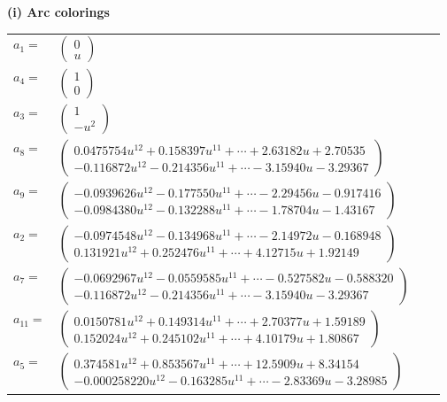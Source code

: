 \documentclass[1p]{elsarticle_modified}
\theoremstyle{definition}
\begin{document}
\flushleft \textbf{(i) Arc colorings}\\
\begin{tabular}{m{7pt} m{180pt} m{7pt} m{180pt} }
\flushright $a_{1}=$&$\begin{pmatrix}0\\u\end{pmatrix}$ \\
\flushright $a_{4}=$&$\begin{pmatrix}1\\0\end{pmatrix}$ \\
\flushright $a_{3}=$&$\begin{pmatrix}1\\- u^2\end{pmatrix}$ \\
\flushright $a_{8}=$&$\begin{pmatrix}0.0475754 u^{12}+0.158397 u^{11}+\cdots+2.63182 u+2.70535\\-0.116872 u^{12}-0.214356 u^{11}+\cdots-3.15940 u-3.29367\end{pmatrix}$ \\
\flushright $a_{9}=$&$\begin{pmatrix}-0.0939626 u^{12}-0.177550 u^{11}+\cdots-2.29456 u-0.917416\\-0.0984380 u^{12}-0.132288 u^{11}+\cdots-1.78704 u-1.43167\end{pmatrix}$ \\
\flushright $a_{2}=$&$\begin{pmatrix}-0.0974548 u^{12}-0.134968 u^{11}+\cdots-2.14972 u-0.168948\\0.131921 u^{12}+0.252476 u^{11}+\cdots+4.12715 u+1.92149\end{pmatrix}$ \\
\flushright $a_{7}=$&$\begin{pmatrix}-0.0692967 u^{12}-0.0559585 u^{11}+\cdots-0.527582 u-0.588320\\-0.116872 u^{12}-0.214356 u^{11}+\cdots-3.15940 u-3.29367\end{pmatrix}$ \\
\flushright $a_{11}=$&$\begin{pmatrix}0.0150781 u^{12}+0.149314 u^{11}+\cdots+2.70377 u+1.59189\\0.152024 u^{12}+0.245102 u^{11}+\cdots+4.10179 u+1.80867\end{pmatrix}$ \\
\flushright $a_{5}=$&$\begin{pmatrix}0.374581 u^{12}+0.853567 u^{11}+\cdots+12.5909 u+8.34154\\-0.000258220 u^{12}-0.163285 u^{11}+\cdots-2.83369 u-3.28985\end{pmatrix}$ \\

\end{tabular}
\end{document}
